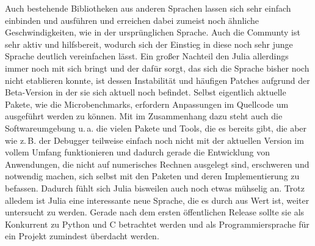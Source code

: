 \documentclass[proseminar,german,utf8]{zihpub}
\newcommand{\zB}[0]{{z.\,B. }}
\newcommand{\ua}[0]{{u.\,a. }}
\begin{document}
Auch bestehende Bibliotheken aus anderen Sprachen lassen sich sehr einfach einbinden und ausführen und erreichen dabei zumeist noch ähnliche Geschwindigkeiten, wie in der ursprünglichen Sprache. Auch die Communty ist sehr aktiv und hilfsbereit, wodurch sich der Einstieg in diese noch sehr junge Sprache deutlich vereinfachen lässt. Ein großer Nachteil den Julia allerdings immer noch mit sich bringt und der dafür sorgt, das sich die Sprache bisher noch nicht etablieren konnte, ist dessen Instabilität und häufigen Patches aufgrund der Beta-Version in der sie sich aktuell noch befindet. Selbst eigentlich aktuelle Pakete, wie die Microbenchmarks, erfordern Anpassungen im Quellcode um ausgeführt werden zu können. Mit im Zusammenhang dazu steht auch die Softwareumgebung \ua die vielen Pakete und Tools, die es bereits gibt, die aber wie \zB der Debugger teilweise einfach noch nicht mit der aktuellen Version im vollem Umfang funktionieren und dadurch gerade die Entwicklung von Anwendungen, die nicht auf numerisches Rechnen ausgelegt sind, erschweren und notwendig machen, sich selbst mit den Paketen und deren Implementierung zu befassen. Dadurch fühlt sich Julia bisweilen auch noch etwas mühselig an. Trotz alledem ist Julia eine interessante neue Sprache, die es durch aus Wert ist, weiter untersucht zu werden. Gerade nach dem ersten öffentlichen Release sollte sie als Konkurrent zu Python und C betrachtet werden und als Programmiersprache für ein Projekt zumindest überdacht werden.
\end{document}
